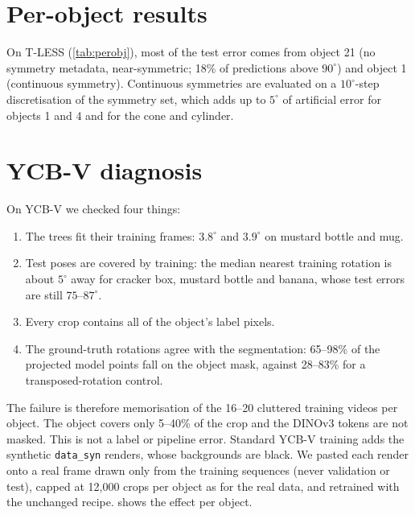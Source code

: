 \begin{table}[h]
  \centering\footnotesize
  
  \caption{\textbf{Per-object BOP metrics of our T-LESS system} (\%; \cref{tab:tless_ar}). We found no published per-object AR for these objects.}
  \label{tab:tless_ar_perobj}
\end{table}

\section{Per-object results}
\begin{table}[h]
  \centering\footnotesize
  
  \caption{\textbf{Per-object test error} of the single-label (A0) trees (3-seed mean; symmetry-aware for T-LESS and SYMSOL-T; YCB-V trained on real videos only).}
  \label{tab:perobj}
\end{table}
On T-LESS (\cref{tab:perobj}), most of the test error comes from object 21 (no symmetry metadata, near-symmetric; 18\% of predictions above $90^\circ$) and object 1 (continuous symmetry). Continuous symmetries are evaluated on a $10^\circ$-step discretisation of the symmetry set, which adds up to $5^\circ$ of artificial error for objects 1 and 4 and for the cone and cylinder.

\section{YCB-V diagnosis}
\label{sec:supp_ycbv}
On YCB-V we checked four things:
\begin{enumerate}
\item The trees fit their training frames: $3.8^\circ$ and $3.9^\circ$ on mustard bottle and mug.
\item Test poses are covered by training: the median nearest training rotation is about $5^\circ$ away for cracker box, mustard bottle and banana, whose test errors are still $75$--$87^\circ$.
\item Every crop contains all of the object's label pixels.
\item The ground-truth rotations agree with the segmentation: 65--98\% of the projected model points fall on the object mask, against 28--83\% for a transposed-rotation control.
\end{enumerate}
The failure is therefore memorisation of the 16--20 cluttered training videos per object. The object covers only 5--40\% of the crop and the DINOv3 tokens are not masked. This is not a label or pipeline error. Standard YCB-V training adds the synthetic \texttt{data\_syn} renders, whose backgrounds are black. We pasted each render onto a real frame drawn only from the training sequences (never validation or test), capped at 12,000 crops per object as for the real data, and retrained with the unchanged recipe.  shows the effect per object.
\begin{table}[h]
  \centering\footnotesize
  
  \caption{\textbf{YCB-V per-object test error} ($^\circ$, single view, 3 seeds) without and with synthetic training data.}
  \label{tab:ycbv_perobj}
\end{table}

